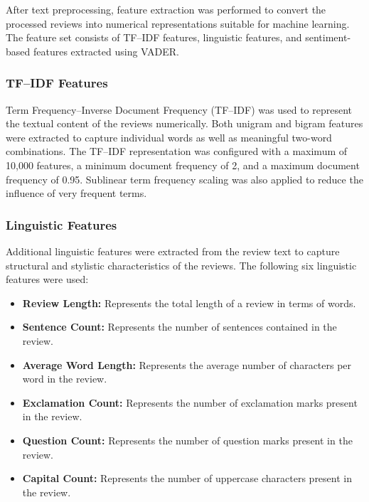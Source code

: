 \documentclass[12pt,a4paper]{report}
\begin{document}
After text preprocessing, feature extraction was performed to convert the processed reviews into numerical representations suitable for machine learning. The feature set consists of TF--IDF features, linguistic features, and sentiment-based features extracted using VADER.

\subsubsection*{TF--IDF Features}

Term Frequency--Inverse Document Frequency (TF--IDF) was used to represent the textual content of the reviews numerically. Both unigram and bigram features were extracted to capture individual words as well as meaningful two-word combinations. The TF--IDF representation was configured with a maximum of 10,000 features, a minimum document frequency of 2, and a maximum document frequency of 0.95. Sublinear term frequency scaling was also applied to reduce the influence of very frequent terms.

\subsubsection*{Linguistic Features}

Additional linguistic features were extracted from the review text to capture structural and stylistic characteristics of the reviews. The following six linguistic features were used:

\begin{itemize}
    \item \textbf{Review Length:} Represents the total length of a review in terms of words.
    
    \item \textbf{Sentence Count:} Represents the number of sentences contained in the review.
    
    \item \textbf{Average Word Length:} Represents the average number of characters per word in the review.
    
    \item \textbf{Exclamation Count:} Represents the number of exclamation marks present in the review.
    
    \item \textbf{Question Count:} Represents the number of question marks present in the review.
    
    \item \textbf{Capital Count:} Represents the number of uppercase characters present in the review.
\end{itemize}
\end{document}
